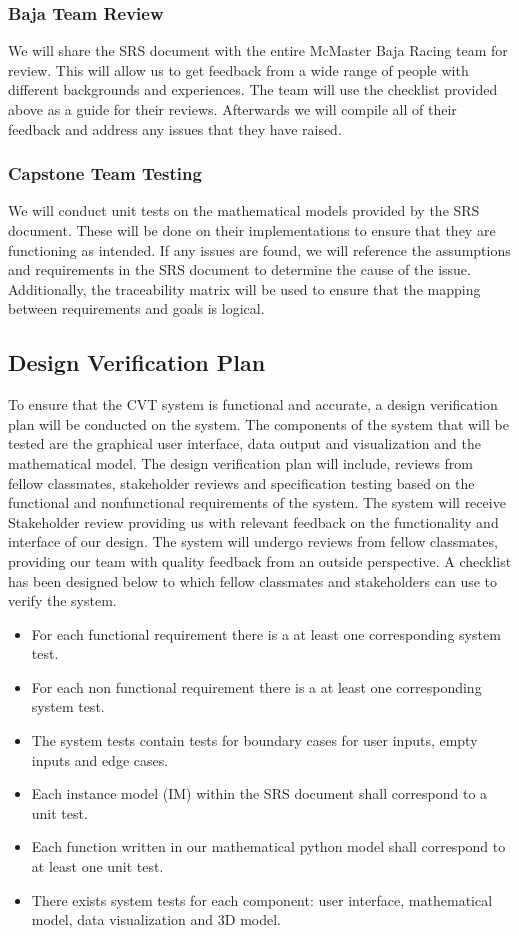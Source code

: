 \documentclass[12pt, titlepage]{article}
\begin{document}
\subsubsection*{Baja Team Review}
We will share the SRS document with the entire McMaster Baja Racing team for review.
This will allow us to get feedback from a wide range of people with different backgrounds and experiences.
The team will use the checklist provided above as a guide for their reviews.
Afterwards we will compile all of their feedback and address any issues that they have raised.

\subsubsection*{Capstone Team Testing}

We will conduct unit tests on the mathematical models provided by the SRS document.
These will be done on their implementations to ensure that they are functioning as intended.
If any issues are found, we will reference the assumptions and requirements in the SRS document to determine the cause of the issue.
Additionally, the traceability matrix will be used to ensure that the mapping between requirements and goals is logical. 

\subsection{Design Verification Plan}

\noindent To ensure that the CVT system is functional and accurate, a design verification plan will be conducted on the system. 
The components of the system that will be tested are the graphical user interface, data output and visualization and the mathematical model. 
The design verification plan will include, reviews from fellow classmates, stakeholder reviews and specification testing based on the functional and nonfunctional requirements of the system. 
The system will receive Stakeholder review providing us with relevant feedback on the functionality and interface of our design.
The system will undergo reviews from fellow classmates, providing our team with quality feedback from an outside perspective. 
A checklist has been designed below to which fellow classmates and stakeholders can use to verify the system.  


\begin{itemize}
  \item For each functional requirement there is a at least one corresponding system test.
  \item For each non functional requirement there is a at least one corresponding system test.  
  \item The system tests contain tests for boundary cases for user inputs, empty inputs and edge cases. 
  \item Each instance model (IM) within the SRS document shall correspond to a unit test. 
  \item Each function written in our mathematical python model shall correspond to at least one unit test. 
  \item There exists system tests for each component: user interface, mathematical model, data visualization and 3D model. 
\end{itemize}
\end{document}
